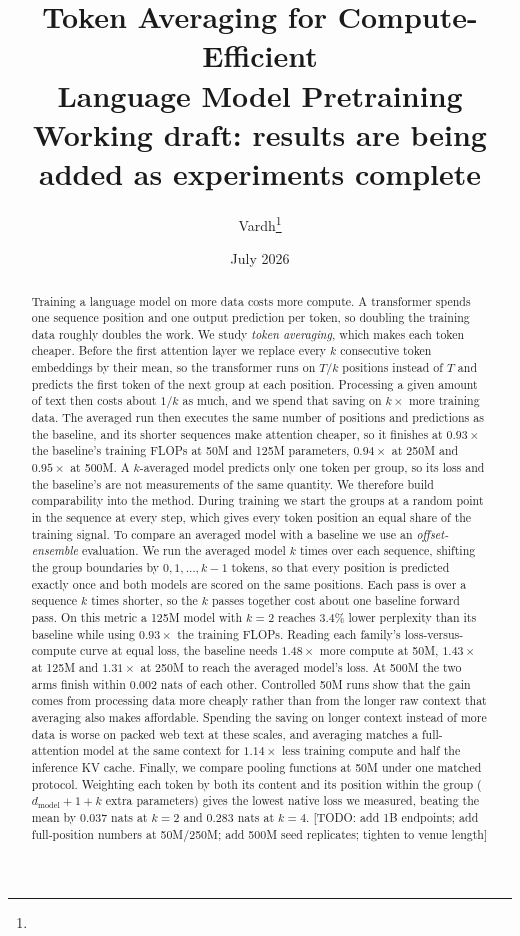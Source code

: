 \documentclass[11pt]{article}
\title{\textbf{Token Averaging for Compute-Efficient\\Language Model Pretraining}\\[0.5em]
\large Working draft: results are being added as experiments complete}
\author{Vardh\thanks{\todo{author list, affiliations, contact}}}
\date{July 2026}
\newcommand{\todo}[1]{\textcolor{warnred}{[TODO: #1]}}
\newcommand{\dmodel}{d_{\mathrm{model}}}
\begin{document}
\maketitle

\begin{abstract}
Training a language model on more data costs more compute. A transformer
spends one sequence position and one output prediction per token, so
doubling the training data roughly doubles the work. We study \emph{token
averaging}, which makes each token cheaper. Before the first attention
layer we replace every $k$ consecutive token embeddings by their mean, so
the transformer runs on $T/k$ positions instead of $T$ and predicts the
first token of the next group at each position. Processing a given amount of
text then costs about $1/k$ as much, and we spend that saving on $k\times$
more training data. The averaged run then executes the same number of
positions and predictions as the baseline, and its shorter sequences make
attention cheaper, so it finishes at $0.93\times$ the baseline's training
FLOPs at 50M and 125M parameters, $0.94\times$ at 250M and $0.95\times$ at
500M. A $k$-averaged model predicts only one token per group, so its loss
and the baseline's are not measurements of the same quantity. We therefore
build comparability into the method. During training we start the groups at
a random point in the sequence at every step, which gives every token
position an equal share of the training signal. To compare an averaged model
with a baseline we use an \emph{offset-ensemble} evaluation. We run the
averaged model $k$ times over each sequence, shifting the group boundaries
by $0, 1, \dots, k{-}1$ tokens, so that every position is predicted exactly
once and both models are scored on the same positions. Each pass is over a
sequence $k$ times shorter, so the $k$ passes together cost about one
baseline forward pass. On this metric a 125M model with $k{=}2$ reaches
$3.4\%$ lower perplexity than its baseline while using $0.93\times$ the
training FLOPs. Reading each family's loss-versus-compute curve at equal
loss, the baseline needs $1.48\times$ more compute at 50M, $1.43\times$ at
125M and $1.31\times$ at 250M to reach the averaged model's loss. At 500M
the two arms finish within $0.002$ nats of each other. Controlled 50M runs
show that the gain comes from processing data more cheaply rather than from
the longer raw context that averaging also makes affordable. Spending the
saving on longer context instead of more data is worse on packed web text at
these scales, and averaging matches a full-attention model at the same
context for $1.14\times$ less training compute and half the inference KV
cache. Finally, we compare pooling functions at 50M under one matched
protocol. Weighting each token by both its content and its position within
the group ($\dmodel{+}1{+}k$ extra parameters) gives the lowest native loss
we measured, beating the mean by $0.037$ nats at $k{=}2$ and $0.283$ nats at
$k{=}4$.
\todo{add 1B endpoints; add full-position numbers at 50M/250M; add 500M seed
replicates; tighten to venue length}
\end{abstract}
\end{document}
